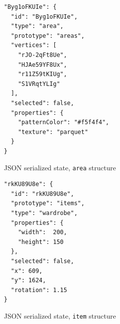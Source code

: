 \begin{listing}
\begin{verbatim}
"Byg1oFKUIe": {
  "id": "Byg1oFKUIe",
  "type": "area",
  "prototype": "areas",
  "vertices": [
    "rJO-2qFt8Ue",
    "HJAe59YF8Ux",
    "r11Z59tKIUg",
    "S1VRqtYLIg"
  ],
  "selected": false,
  "properties": {
    "patternColor": "#f5f4f4",
    "texture": "parquet"
  }
}
\end{verbatim}
\caption{JSON serialized state, {\tt area} structure} 
\label{area}
\end{listing}




\begin{listing}
\begin{verbatim}
"rkKU89U8e": {
  "id": "rkKU89U8e",
  "prototype": "items",
  "type": "wardrobe",
  "properties": {
    "width":  200,
    "height": 150
  },
  "selected": false,
  "x": 609,
  "y": 1624,
  "rotation": 1.15
}
\end{verbatim}
\caption{JSON serialized state, {\tt item} structure} 
\label{lst:item}
\end{listing}

\fi




